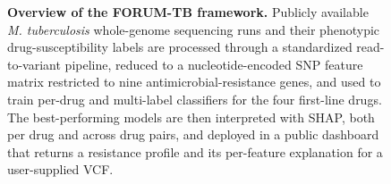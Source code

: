 \begin{figure}[t]
{}
\caption{\textbf{Overview of the FORUM-TB framework.} Publicly available \textit{M. tuberculosis} whole-genome sequencing runs and their phenotypic drug-susceptibility labels are processed through a standardized read-to-variant pipeline, reduced to a nucleotide-encoded SNP feature matrix restricted to nine antimicrobial-resistance genes, and used to train per-drug and multi-label classifiers for the four first-line drugs. The best-performing models are then interpreted with SHAP, both per drug and across drug pairs, and deployed in a public dashboard that returns a resistance profile and its per-feature explanation for a user-supplied VCF.}
\label{fig:pipeline}
\end{figure}
